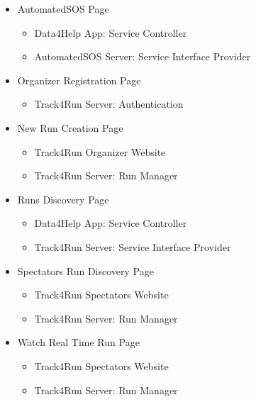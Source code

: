 \documentclass[../DD.tex]{subfiles}
\begin{document}
\begin{itemize}
		\item AutomatedSOS Page
			\begin{itemize}\item{Data4Help App: Service Controller} \item{AutomatedSOS Server: Service Interface Provider}\end{itemize}
		\item Organizer Registration Page
			\begin{itemize}\item{Track4Run Server: Authentication}\end{itemize}
		\item New Run Creation Page
			\begin{itemize}\item{Track4Run Organizer Website} \item{Track4Run Server: Run Manager}\end{itemize}
		\item Runs Discovery Page
			\begin{itemize}\item{Data4Help App: Service Controller} \item{Track4Run Server: Service Interface Provider}\end{itemize}
		\item Spectators Run Discovery Page
			\begin{itemize}\item{Track4Run Spectators Website} \item{Track4Run Server: Run Manager}\end{itemize}
		\item Watch Real Time Run Page
			\begin{itemize}\item{Track4Run Spectators Website} \item{Track4Run Server: Run Manager}\end{itemize}
	\end{itemize}
\end{document}
